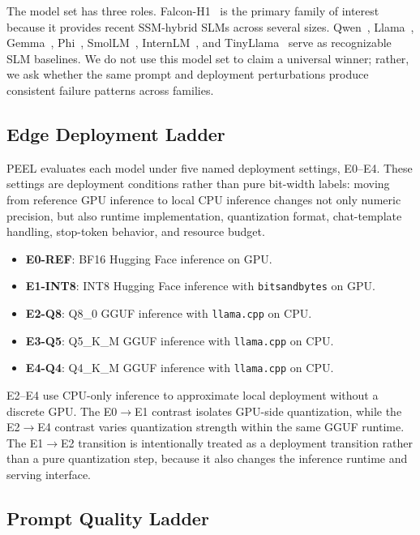 \documentclass[letterpaper]{article} %
\begin{document}
The model set has three roles. Falcon-H1~\citep{falconh1} is the primary family
of interest because it provides recent SSM-hybrid SLMs across several sizes.
Qwen~\citep{qwen2025}, Llama~\citep{llama_3_2},
Gemma~\citep{gemmateam2025gemma3technicalreport}, Phi~\citep{phi4},
SmolLM~\citep{allal2025smollm2smolgoesbig}, InternLM~\citep{cai2024internlm2},
and TinyLlama~\citep{tinyllama_2024} serve as recognizable SLM baselines. We do not use this model set to claim a universal winner; rather, we ask whether the same prompt and deployment perturbations produce consistent failure patterns across families.

\subsection{Edge Deployment Ladder}
\label{sec:edge}

PEEL evaluates each model under five named deployment settings, E0--E4.
These settings are deployment conditions rather than pure bit-width labels:
moving from reference GPU inference to local CPU inference changes not only
numeric precision, but also runtime implementation, quantization format,
chat-template handling, stop-token behavior, and resource budget.
\begin{itemize}
  \item \textbf{E0-REF}: BF16 Hugging Face inference on GPU.
  \item \textbf{E1-INT8}: INT8 Hugging Face inference with
  \texttt{bitsandbytes} on GPU.
  \item \textbf{E2-Q8}: Q8\_0 GGUF inference with \texttt{llama.cpp} on CPU.
  \item \textbf{E3-Q5}: Q5\_K\_M GGUF inference with \texttt{llama.cpp} on CPU.
  \item \textbf{E4-Q4}: Q4\_K\_M GGUF inference with \texttt{llama.cpp} on CPU.
\end{itemize}

E2--E4 use CPU-only inference to approximate local deployment without a
discrete GPU. The E0$\rightarrow$E1 contrast isolates GPU-side quantization,
while the E2$\rightarrow$E4 contrast varies quantization strength within the
same GGUF runtime. The E1$\rightarrow$E2 transition is intentionally treated as
a deployment transition rather than a pure quantization step, because it also
changes the inference runtime and serving interface.

\subsection{Prompt Quality Ladder}
\label{sec:prompt}
\end{document}
